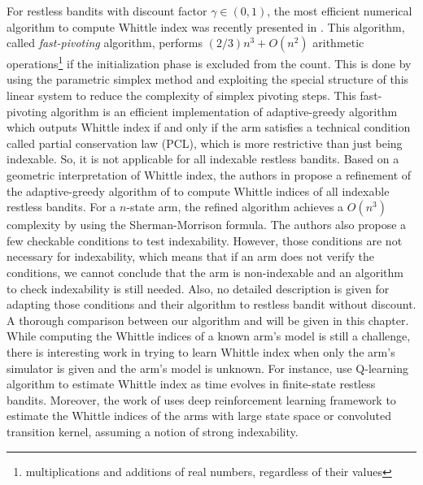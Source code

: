 For restless bandits with discount factor $\gamma\in(0,1)$, the most efficient numerical algorithm to compute Whittle index was recently presented in \cite{nino2020fast}.
This algorithm, called \emph{fast-pivoting} algorithm, performs $(2/3)n^3+O(n^2)$ arithmetic operations\footnote{multiplications and additions of real numbers, regardless of their values} if the initialization phase is excluded from the count.
This is done by using the parametric simplex method and  exploiting the special structure of this linear system to  reduce the complexity of simplex pivoting steps.
This fast-pivoting algorithm is an efficient implementation of adaptive-greedy algorithm \cite{nino2007dynamic} which outputs Whittle index if and only if the arm satisfies a technical condition called partial conservation law (PCL), which is more restrictive than just being indexable.
So, it is not applicable for all indexable restless bandits.
Based on a geometric interpretation of Whittle index, the authors in \cite{akbarzadeh2020conditions} propose a refinement of the adaptive-greedy algorithm of \cite{nino2007dynamic} to compute Whittle indices of all indexable restless bandits.
For a $n$-state arm, the refined algorithm achieves a $O(n^3)$ complexity by using the  Sherman-Morrison formula.
The authors also propose a few checkable conditions to test indexability.
However, those conditions are not necessary for indexability, which means that if an arm does not verify the conditions, we cannot conclude that the arm is non-indexable and an algorithm to check indexability is still needed.
Also, no detailed description is given for adapting those conditions and their algorithm to restless bandit without discount.
A thorough comparison between our algorithm and \cite{akbarzadeh2020conditions,nino2020fast} will be given in this chapter. 
While computing the Whittle indices of a known arm's model is still a challenge, there is interesting work in trying to learn Whittle index when only the arm's simulator is given and the arm's model is unknown.
For instance, \cite{gibson2021novel, avrachenkov2022whittle, fu2019towards} use Q-learning algorithm to estimate Whittle index as time evolves in finite-state restless bandits. Moreover,
the work of \cite{nakhleh2021neurwin} uses deep reinforcement learning framework to estimate the Whittle indices of the arms with large state space or convoluted transition kernel, assuming a notion of strong indexability. 

